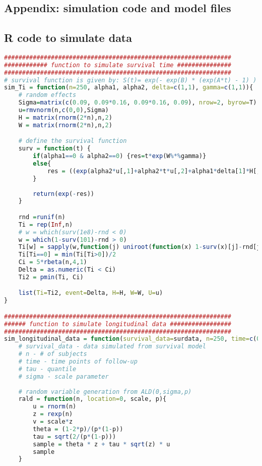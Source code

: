 \documentclass{article}
\begin{document}
\begin{appendices}
\section{Appendix: simulation code and model files}
\subsection{R code to simulate data}
\begin{lstlisting}[language=R]
###############################################################
############ function to simulate survival time ###############
###############################################################
# survival function is given by: S(t)= exp(- exp(B) * (exp(A*t) - 1) ) / A)
sim_Ti = function(n=250, alpha1, alpha2, delta=c(1,1), gamma=c(1,1)){
	# random effects
	Sigma=matrix(c(0.09, 0.09*0.16, 0.09*0.16, 0.09), nrow=2, byrow=T)
	u=rmvnorm(n,c(0,0),Sigma)
	H = matrix(rnorm(2*n),n,2)
	W = matrix(rnorm(2*n),n,2)

	# define the survival function
	surv = function(t) {
		if(alpha1==0 & alpha2==0) {res=t*exp(W%*%gamma)}
		else{
			res = ((exp(alpha2*u[,1]+alpha2*t*u[,2]+alpha1*delta[1]*H[,1]+alpha1*delta[2]*H[,2]*t+W%*%gamma)-exp(alpha1*H[,1]*delta[1]+W%*%gamma+alpha2*u[,1]))/(alpha2*u[,2]+alpha1*H[,2]*delta[2]))
		}
		
		return(exp(-res))
	}

	rnd =runif(n) 
	Ti = rep(Inf,n) 
	# w = which(surv(1e8)-rnd < 0)
	w = which(1-surv(101)-rnd > 0)
	Ti[w] = sapply(w,function(j) uniroot(function(x) 1-surv(x)[j]-rnd[j],lower=0,upper=101)$root)
	Ti[Ti==0] = min(Ti[Ti>0])/2
	Ci = 5*rbeta(n,4,1)
	Delta = as.numeric(Ti < Ci)
	Ti2 = pmin(Ti, Ci)

	list(Ti=Ti2, event=Delta, H=H, W=W, U=u)
}

###############################################################
###### function to simulate longitudinal data #################
###############################################################
sim_longitudinal_data = function(survival_data=surdata, n=250, time=c(0, 0.25, 0.5, 0.75, 1, 3), tau, sigma=1, beta=c(1,1), delta=c(1,1)){
	# survival_data - data simulated from survival model
	# n - # of subjects
	# time - time points of follow-up
	# tau - quantile
	# sigma - scale parameter
	
	# random variable generation from ALD(0,sigma,p)
	rald = function(n, location=0, scale, p){
		u = rnorm(n)
		z = rexp(n)
		v = scale*z
		theta = (1-2*p)/(p*(1-p))
		tau = sqrt(2/(p*(1-p)))
		sample = theta * z + tau * sqrt(z) * u
		sample
	}


\end{lstlisting}
\end{appendices}
\end{document}
